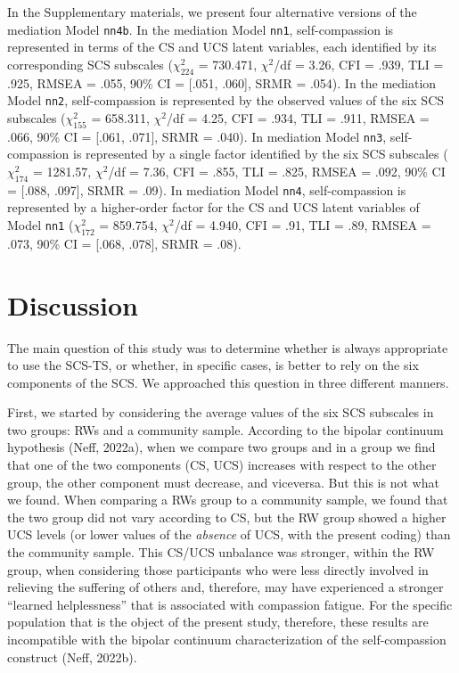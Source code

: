 \documentclass[
  man]{apa7}
\begin{document}
In the Supplementary materials, we present four alternative versions of the mediation Model \texttt{nn4b}. In the mediation Model \texttt{nn1}, self-compassion is represented in terms of the CS and UCS latent variables, each identified by its corresponding SCS subscales (\(\chi^2_{224}\) = 730.471, \(\chi^2\)/df = 3.26, CFI = .939, TLI = .925, RMSEA = .055, 90\% CI = {[}.051, .060{]}, SRMR = .054). In the mediation Model \texttt{nn2}, self-compassion is represented by the observed values of the six SCS subscales (\(\chi^2_{155}\) = 658.311, \(\chi^2\)/df = 4.25, CFI = .934, TLI = .911, RMSEA = .066, 90\% CI = {[}.061, .071{]}, SRMR = .040). In mediation Model \texttt{nn3}, self-compassion is represented by a single factor identified by the six SCS subscales (\(\chi^2_{174}\) = 1281.57, \(\chi^2\)/df = 7.36, CFI = .855, TLI = .825, RMSEA = .092, 90\% CI = {[}.088, .097{]}, SRMR = .09). In mediation Model \texttt{nn4}, self-compassion is represented by a higher-order factor for the CS and UCS latent variables of Model \texttt{nn1} (\(\chi^2_{172}\) = 859.754, \(\chi^2\)/df = 4.940, CFI = .91, TLI = .89, RMSEA = .073, 90\% CI = {[}.068, .078{]}, SRMR = .08).

\hypertarget{discussion}{%
\section{Discussion}\label{discussion}}

The main question of this study was to determine whether is always appropriate to use the SCS-TS, or whether, in specific cases, is better to rely on the six components of the SCS. We approached this question in three different manners.

First, we started by considering the average values of the six SCS subscales in two groups: RWs and a community sample. According to the bipolar continuum hypothesis (Neff, 2022a), when we compare two groups and in a group we find that one of the two components (CS, UCS) increases with respect to the other group, the other component must decrease, and viceversa. But this is not what we found. When comparing a RWs group to a community sample, we found that the two group did not vary according to CS, but the RW group showed a higher UCS levels (or lower values of the \emph{absence} of UCS, with the present coding) than the community sample. This CS/UCS unbalance was stronger, within the RW group, when considering those participants who were less directly involved in relieving the suffering of others and, therefore, may have experienced a stronger ``learned helplessness'' that is associated with compassion fatigue. For the specific population that is the object of the present study, therefore, these results are incompatible with the bipolar continuum characterization of the self-compassion construct (Neff, 2022b).
\end{document}
